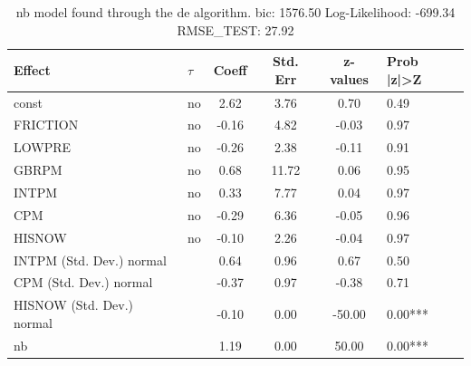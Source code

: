 \begin{table}
	\caption{nb model found through the de algorithm. bic: 1576.50 Log-Likelihood: -699.34 RMSE_TEST: 27.92}
	\begin{center}
		\begin{tabular}{|l|l|c|c|c|l|}
			\hline
			Effect & $\tau$ & Coeff & Std. Err & z-values & Prob |z|>Z \\
			\hline
			const & no & 2.62 & 3.76 & 0.70 & 0.49 \\
			\hline
			FRICTION & no & -0.16 & 4.82 & -0.03 & 0.97 \\
			\hline
			LOWPRE & no & -0.26 & 2.38 & -0.11 & 0.91 \\
			\hline
			GBRPM & no & 0.68 & 11.72 & 0.06 & 0.95 \\
			\hline
			INTPM & no & 0.33 & 7.77 & 0.04 & 0.97 \\
			\hline
			CPM & no & -0.29 & 6.36 & -0.05 & 0.96 \\
			\hline
			HISNOW & no & -0.10 & 2.26 & -0.04 & 0.97 \\
			\hline
			INTPM (Std. Dev.) normal &  & 0.64 & 0.96 & 0.67 & 0.50 \\
			\hline
			CPM (Std. Dev.) normal &  & -0.37 & 0.97 & -0.38 & 0.71 \\
			\hline
			HISNOW (Std. Dev.) normal &  & -0.10 & 0.00 & -50.00 & 0.00*** \\
			\hline
			nb &  & 1.19 & 0.00 & 50.00 & 0.00*** \\
			\hline
		\end{tabular}
	\end{center}
\end{table}